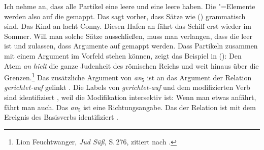 \noindent
Ich nehme an, dass alle Partikel eine leere \subjl und eine leere \sprl haben. Die \argst"=Elemente
werden also auf die \compsl gemappt. Das sagt vorher, dass Sätze wie () grammatisch
sind. 
\eal
\ex Das Kind an lacht Conny.
\ex Diesen Hafen an fährt das Schiff erst wieder im Sommer.
\zl
Will man solche Sätze ausschließen, muss man verlangen, dass die \compsl leer ist und zulassen, dass
Argumente auf \subj gemappt werden. Dass Partikeln zusammen mit einem Argument im Vorfeld stehen
können, zeigt das Beispiel in ():
\ea
\label{bsp-den-atem-an-haelt}
Den Atem \emph{an} \emph{hielt} die ganze Judenheit des römischen Reichs und weit hinaus über die Grenzen.\footnote{
        Lion Feuchtwanger, \emph{Jud Süß}, S.\,276, zitiert nach .
}
\z
Das zusätzliche Argument von \emph{an$_5$} ist an das Argument der Relation \emph{gerichtet-auf}
gelinkt . Die Labels von \emph{gerichtet-auf} und dem modifizierten Verb sind identifiziert
, weil die Modifikation intersektiv ist: Wenn man etwas anfährt, fährt man auch. Das
\emph{an$_5$} ist eine Richtungsangabe. Das \argzero der Relation ist mit dem Ereignis des Basisverbs identifiziert .


